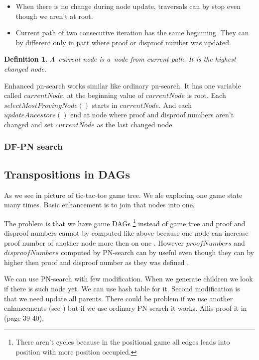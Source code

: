 \begin{itemize}
\item When there is no change during node update, traversals can by stop even though we
aren't at root.
\item Current path of two consecutive iteration has the same beginning. They can by different 
only in part where proof or disproof number was updated.
\end{itemize}

\newtheorem*{currentNode}{Definition}	
\begin{currentNode}
A~{\sl current node} is a~node from current path. It is the highest changed node.
\end{currentNode}


Enhanced pn-search works similar like ordinary pn-search. It has one variable
called $currentNode$, at the beginning value of $currentNode$ is root. Each
$selectMostProvingNode()$ starts in $currentNode$. And each $updateAncestors()$
end at node where proof and disproof numbers aren't changed and set
$currentNode$ as the last changed node.

\subsubsection{DF-PN search}


\subsection{Transpositions in DAGs}

As we see in picture  of tic-tac-toe game tree.  We ale exploring one
game state many times. Basic enhancement is to join that nodes into one.

The problem is that we have game DAGs \footnote{There aren't cycles because in the
positional game all edges leads into position with more position occupied.}
instead of game tree and proof and disproof numbers
cannot by computed like above because one node can increase proof number of
another node more then on one . However $proofNumbers$ and $disproofNumbers$
computed by PN-search can by useful even though they can by higher then proof
and disproof number as they was defined . 

We can use PN-search with few modification. When we generate children we look
if there is such node yet. We can use hash table for it. Second modification is
that we need update all parents. There could be problem if we use another
enhancements (see ) but if we use ordinary PN-search it works. Allis
proof it in \cite{allis} (page 39-40).


